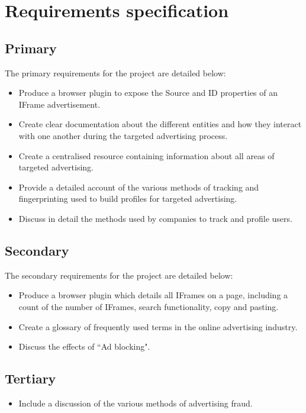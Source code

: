 \documentclass[12pt]{article}
\begin{document}
\section{Requirements specification} \label{requirements}

\subsection{Primary}
The primary requirements for the project are detailed below:
\begin{itemize}
    \item Produce a browser plugin to expose the Source and ID properties of an IFrame advertisement.
    \item Create clear documentation about the different entities and how they interact with one another during the targeted advertising process.
    \item Create a centralised resource containing information about all areas of targeted advertising.
    \item Provide a detailed account of the various methods of tracking and fingerprinting used to build profiles for targeted advertising.
    \item Discuss in detail the methods used by companies to track and profile users. 
\end{itemize}

\subsection{Secondary}
The secondary requirements for the project are detailed below:
\begin{itemize}
    \item Produce a browser plugin which details all IFrames on a page, including a count of the number of IFrames, search functionality, copy and pasting. 
    \item Create a glossary of frequently used terms in the online advertising industry.
    \item Discuss the effects of ``Ad blocking". 
\end{itemize}

\subsection{Tertiary}
\begin{itemize}
    \item Include a discussion of the various methods of advertising fraud.
\end{itemize}
\end{document}
